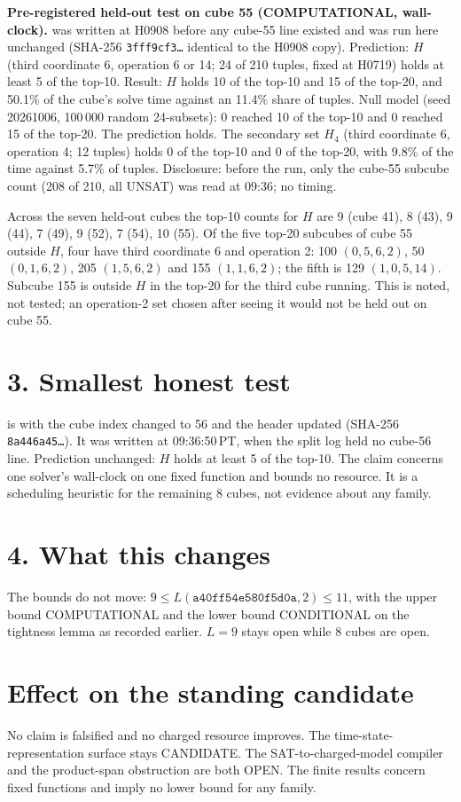 \documentclass[11pt]{article}
\begin{document}
\textbf{Pre-registered held-out test on cube 55 (COMPUTATIONAL, wall-clock).}  was written at H0908 before any cube-55 line existed and was run here unchanged (SHA-256 \texttt{3fff9cf3\ldots} identical to the H0908 copy). Prediction: $H$ (third coordinate 6, operation 6 or 14; 24 of 210 tuples, fixed at H0719) holds at least 5 of the top-10. Result: $H$ holds 10 of the top-10 and 15 of the top-20, and 50.1\% of the cube's solve time against an 11.4\% share of tuples. Null model (seed 20261006, 100\,000 random 24-subsets): 0 reached 10 of the top-10 and 0 reached 15 of the top-20. The prediction holds. The secondary set $H_4$ (third coordinate 6, operation 4; 12 tuples) holds 0 of the top-10 and 0 of the top-20, with 9.8\% of the time against 5.7\% of tuples. Disclosure: before the run, only the cube-55 subcube count (208 of 210, all UNSAT) was read at 09:36; no timing.

Across the seven held-out cubes the top-10 counts for $H$ are 9 (cube 41), 8 (43), 9 (44), 7 (49), 9 (52), 7 (54), 10 (55). Of the five top-20 subcubes of cube 55 outside $H$, four have third coordinate 6 and operation 2: 100 $(0,5,6,2)$, 50 $(0,1,6,2)$, 205 $(1,5,6,2)$ and 155 $(1,1,6,2)$; the fifth is 129 $(1,0,5,14)$. Subcube 155 is outside $H$ in the top-20 for the third cube running. This is noted, not tested; an operation-2 set chosen after seeing it would not be held out on cube 55.

\section*{3. Smallest honest test}
 is  with the cube index changed to 56 and the header updated (SHA-256 \texttt{8a446a45\ldots}). It was written at 09:36:50\,PT, when the split log held no cube-56 line. Prediction unchanged: $H$ holds at least 5 of the top-10. The claim concerns one solver's wall-clock on one fixed function and bounds no resource. It is a scheduling heuristic for the remaining 8 cubes, not evidence about any family.

\section*{4. What this changes}
The bounds do not move: $9\le L(\texttt{a40ff54e580f5d0a},2)\le 11$, with the upper bound COMPUTATIONAL and the lower bound CONDITIONAL on the tightness lemma as recorded earlier. $L=9$ stays open while 8 cubes are open.

\section*{Effect on the standing candidate}
No claim is falsified and no charged resource improves. The time-state-representation surface stays CANDIDATE. The SAT-to-charged-model compiler and the product-span obstruction are both OPEN. The finite results concern fixed functions and imply no lower bound for any family.
\end{document}
